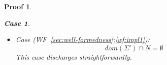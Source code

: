 \documentclass[showabstract,showacknowledgments,showpreface,showdedication,school]{iuphd}
\newtheorem*{bcase}{Case}
\theoremstyle{nonumberplain}
\newtheorem{nproof}{Proof}
\newcommand{\keywd}[1]{\mathit{#1}}
\newcommand{\STOR}{\keywd{S}}
\newcommand{\SENV}{\keywd{\Sigma}}
\newcommand{\MENV}{\keywd{M}}
\newcommand{\AENV}{\keywd{A}}
\newcommand{\NENV}{\keywd{N}}
\newcommand{\storewfca}[4]{\ensuremath{#1;#2 \vdash_{wf_{ca}} #3;#4}}
\newcommand{\refwellformed}[2]{WF~\ref{#1};\ref{#2}}
\begin{document}
\begin{nproof}
\begin{bcase}
\begin{itemize}
\begin{itemize}
      \begin{align*}
      \storewfca{\AENV}{\NENV}{\MENV}{\STOR}
      \end{align*}
      This case discharges immediately because the relevant environments
      are affected by neither the of the relevant typing nor the dynamic-semantic judgement.
      \item
      Case (\refwellformed{sec:well-formedness}{wf:impl1}):
      \begin{displaymath}
      dom(\SENV') \cap \NENV = \emptyset
      \end{displaymath}
      This case discharges straightforwardly.
      \end{itemize}
    \end{itemize}
  \end{bcase}


\end{nproof}
\end{document}
